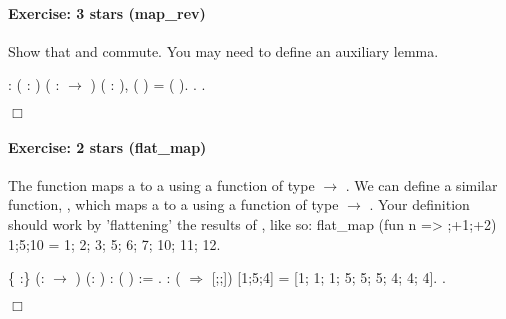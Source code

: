 \documentclass[12pt]{report}
\begin{document}
\paragraph{Exercise: 3 stars (map\_rev)}

 Show that  and  commute.  You may need to define an
    auxiliary lemma. \begin{coqdoccode}
\coqdocemptyline
\coqdocnoindent
{}  : \coqdockw{\ensuremath{\forall}} (  : ) ( :  \ensuremath{\rightarrow} ) ( :  ),\coqdoceol
\coqdocindent{1.00em}
  ( ) =  (  ).\coqdoceol
\coqdocnoindent
{}.\coqdoceol
 .\coqdoceol
\end{coqdoccode}
\ensuremath{\Box} 

\paragraph{Exercise: 2 stars (flat\_map)}

 The function  maps a   to a   using a function
    of type  \ensuremath{\rightarrow} .  We can define a similar function, ,
    which maps a   to a   using a function  of type
     \ensuremath{\rightarrow}  .  Your definition should work by 'flattening' the
    results of , like so:
        flat\_map (fun n => ;+1;+2) 1;5;10
      = 1; 2; 3; 5; 6; 7; 10; 11; 12.
\begin{coqdoccode}
\coqdocemptyline
\coqdocnoindent
{}  \{ :\} (: \ensuremath{\rightarrow}  ) (: )\coqdoceol
\coqdocindent{9.50em}
: ( ) :=\coqdoceol
\coqdocindent{1.00em}
 .\coqdoceol
\coqdocemptyline
\coqdocnoindent
{} :\coqdoceol
\coqdocindent{1.00em}
 (  \ensuremath{\Rightarrow} [;;]) [1;5;4]\coqdoceol
\coqdocindent{1.00em}
= [1; 1; 1; 5; 5; 5; 4; 4; 4].\coqdoceol
 .\coqdoceol
\end{coqdoccode}
\ensuremath{\Box} 
\end{document}
